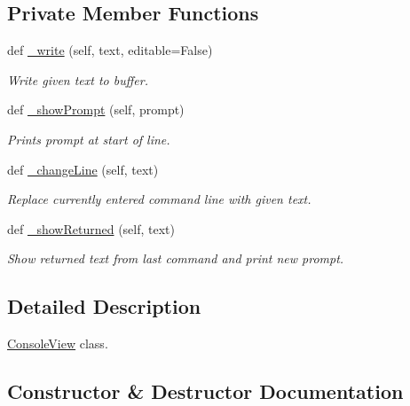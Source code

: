 \subsection*{Private Member Functions}
\begin{DoxyCompactItemize}
\item 
def \hyperlink{classvisualizer_1_1ipython__view_1_1ConsoleView_a9759d9e625a21718dcd1dfe1188cc1d2}{\+\_\+write} (self, text, editable=False)
\begin{DoxyCompactList}\small\item\em Write given text to buffer. \end{DoxyCompactList}\item 
def \hyperlink{classvisualizer_1_1ipython__view_1_1ConsoleView_a539d2a93fbf7a7c8ca1e6fa9fe2aa875}{\+\_\+show\+Prompt} (self, prompt)
\begin{DoxyCompactList}\small\item\em Prints prompt at start of line. \end{DoxyCompactList}\item 
def \hyperlink{classvisualizer_1_1ipython__view_1_1ConsoleView_a99b5d6dfa4e9fdffb00d434912a6429c}{\+\_\+change\+Line} (self, text)
\begin{DoxyCompactList}\small\item\em Replace currently entered command line with given text. \end{DoxyCompactList}\item 
def \hyperlink{classvisualizer_1_1ipython__view_1_1ConsoleView_a5fd73a63b28d972cb73270c6101d4eb0}{\+\_\+show\+Returned} (self, text)
\begin{DoxyCompactList}\small\item\em Show returned text from last command and print new prompt. \end{DoxyCompactList}\end{DoxyCompactItemize}


\subsection{Detailed Description}
\hyperlink{classvisualizer_1_1ipython__view_1_1ConsoleView}{Console\+View} class. 

\subsection{Constructor \& Destructor Documentation}
